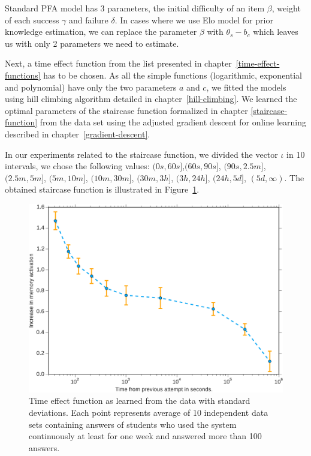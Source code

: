 Standard PFA model has 3 parameters, the initial difficulty of an item $\beta$, weight of each success $\gamma$ and failure $\delta$. In cases where we use Elo model for prior knowledge estimation, we can replace the parameter $\beta$ with $\theta_s - b_c$ which leaves us with only 2 parameters we need to estimate.

Next, a time effect function from the list presented in chapter~\ref{time-effect-functions} has to be chosen. As all the simple functions (logarithmic, exponential and polynomial) have only the two parameters $a$ and $c$, we fitted the models using hill climbing algorithm detailed in chapter~\ref{hill-climbing}. We learned the optimal parameters of the staircase function formalized in chapter \ref{staircase-function} from the data set using the adjusted gradient descent for online learning described in chapter~\ref{gradient-descent}.

In our experiments related to the staircase function, we divided the vector $\iota$ in 10 intervals, we chose the following values: $(0s, 60s]$,$(60s, 90s]$, $(90s, 2.5m]$, $(2.5m, 5m]$, $(5m, 10m]$, $(10m, 30m]$, $(30m, 3h]$, $(3h, 24h]$, $(24h, 5d]$, $(5d, \infty)$. The obtained staircase function is illustrated in Figure~\ref{fig:learned-time-effect-function}.

\begin{figure}[htbp]
  \centering
  \includegraphics[width=\textwidth]{img/learned-time-effect-function}
  \caption{Time effect function as learned from the data with standard deviations. Each point represents average of 10 independent data sets containing answers of students who used the system continuously at least for one week and answered more than 100 answers.}
  \label{fig:learned-time-effect-function}
\end{figure}

